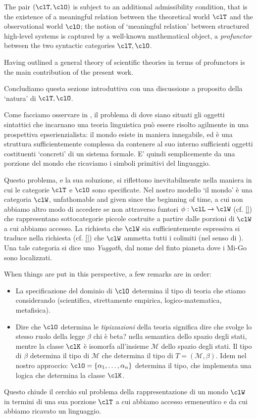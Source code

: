 The pair $(\clT,\clO)$ is subject to an additional admissibility condition, that is the existence of a meaningful relation between the theoretical world $\clT$ and the observational world $\clO$; the notion of `meaningful relation' between structured high-level systems is captured by a well-known mathematical object, a \emph{profunctor} between the two syntactic categories $\clT,\clO$. 

Having outlined a general theory of scientific theories in terms of profunctors is the main contribution of the present work.

Concludiamo questa sezione introduttiva con una discussione a proposito della `natura' di $\clT,\clO$.

Come facciamo osservare in \cite{canont1}, il problema di dove siano situati gli oggetti sintattici che incarnano una teoria linguistica può essere risolto agilmente in una prospettiva epserienzialista: il mondo esiste in maniera innegabile, ed è una struttura sufficientemente complessa da contenere al suo interno sufficienti oggetti costituenti `concreti' di un sistema formale. E' quindi semplicemente da una porzione del mondo che ricaviamo i simboli primitivi del linguaggio.

Questo problema, e la sua soluzione, si riflettono inevitabilmente nella maniera in cui le categorie $\clT$ e $\clO$ sono specificate. Nel nostro modello `il mondo' è una categoria $\clW$, unfathomable and given since the beginning of time, a cui non abbiamo altro modo di accedere se non attraverso funtori $\phi : \clL \to \clW$ (cf. \autoref{}) che rappresentano sottocategorie piccole costruite a partire dalle porzioni di $\clW$ a cui abbiamo accesso. La richiesta che $\clW$ sia sufficientemente espressiva si traduce nella richiesta (cf. \autoref{}) che $\clW$ ammetta tutti i colimiti (nel senso di \cite[??]{Bor1}). Una tale categoria si dice uno \emph{Yuggoth}, dal nome del finto pianeta dove i Mi-Go sono localizzati.

When things are put in this perspective, a few remarks are in order: 
\begin{itemize}
	\item La specificazione del dominio di $\clO$ determina il tipo di teoria che stiamo considerando (scientifica, strettamente empirica, logico-matematica, metafisica).
	\item Dire che $\clO$ determina le \emph{tipizzazioni} della teoria significa dire che svolge lo stesso ruolo della legge $\beta$ {\color{red} chi è beta?} nella semantica dello spazio degli stati, mentre la classe $\clK$ è isomorfa all'insieme $\mathcal{M}$ dello spazio degli stati. Il tipo di $\beta$ determina il tipo di $\mathcal{M}$ che determina il tipo di $T = (\mathcal{M}, \beta)$. Idem nel nostro approccio: $\clO 	= \{\alpha_1,\dots,\alpha_n\}$ determina il tipo, che implementa una logica che determina la classe $\clK$.
\end{itemize}
Questo chiude il cerchio sul problema della rappresentazione di un mondo $\clW$ in termini di una sua porzione $\clT$ a cui abbiamo accesso ermeneutico e da cui abbiamo ricavato un linguaggio.

